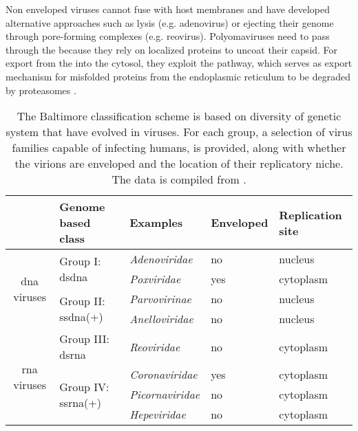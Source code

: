 Non enveloped viruses cannot fuse with host membranes and have developed alternative approaches such as lysis (e.g. adenovirus) or ejecting their genome through pore-forming complexes (e.g. reovirus). Polyomaviruses need to pass through the  because they rely on  localized proteins to uncoat their capsid. For export from the  into the cytosol, they exploit the  pathway, which serves as export mechanism for misfolded proteins from the endoplasmic reticulum to be degraded by proteasomes \citep{Smith2012}.

\renewcommand{\arraystretch}{1.5}

\begin{table}
  \centering
  \caption[The Baltimore classification scheme for viruses.]{The Baltimore classification scheme is based on diversity of genetic system that have evolved in viruses. For each group, a selection of virus families capable of infecting humans, is provided, along with whether the virions are enveloped and the location of their replicatory niche. The data is compiled from \citet{Hulo2011}.}
  \label{tab:baltimore-classification}
  \footnotesize
  \begin{tabular}{c|llll}
    & Genome based class & Examples & Enveloped & Replication site \\
    \hline \multirow{4}{*}{\begin{sideways}\acrshort{dna} viruses\end{sideways}} &
    \multirow{2}{*}{Group I: \acrshort{dsdna}} &
    \textit{Adenoviridae} &
    no & nucleus \\
    &
    & \textit{Poxviridae} &
    yes & cytoplasm \\
    \cline{2-5} &
    \multirow{2}{*}{Group II: \acrshort{ssdna}(+)} &
    \textit{Parvovirinae} &
    no & nucleus \\
    &
    & \textit{Anelloviridae} &
    no & nucleus \\
    \hline \multirow{6}{*}{\begin{sideways}\acrshort{rna} viruses\end{sideways}} &   
    Group III: \acrshort{dsrna} &
    \textit{Reoviridae} &
    no & cytoplasm \\
    \cline{2-5} &
    \multirow{3}{*}{Group IV: \acrshort{ssrna}(+)} &
    \textit{Coronaviridae} &
    yes & cytoplasm \\
    &
    & \textit{Picornaviridae} &
    no & cytoplasm \\
    &
    & \textit{Hepeviridae} &
    no & cytoplasm \\

\end{tabular}
\end{table}
